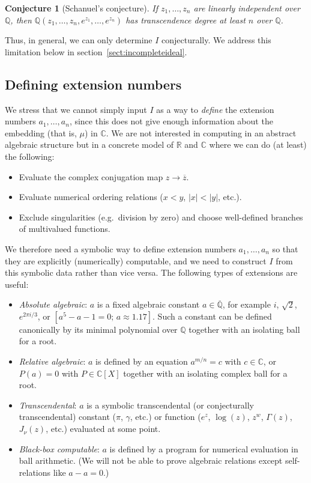 \documentclass[sigconf,screen,urlbreakonhyphens]{acmart}
\newtheorem{conjecture}[theorem]{Conjecture}
\begin{document}
\begin{conjecture}[Schanuel's conjecture]
If $z_1,\ldots,z_n$ are linearly independent over $\mathbb{Q}$,
then $\mathbb{Q}(z_1,\ldots,z_n,e^{z_1},\ldots,e^{z_n})$ has
transcendence degree at least $n$ over $\mathbb{Q}$.
\end{conjecture}

Thus, in general, we can only determine $I$ conjecturally.
We address this limitation below in section~\ref{sect:incompleteideal}.

\subsection{Defining extension numbers}

We stress that we cannot simply input $I$ as a way to \emph{define}
the extension numbers $a_1,\ldots,a_n$, since this does not
give enough information about the embedding (that is, $\mu$) in $\mathbb{C}$.
We are not interested in computing in an abstract algebraic
structure but in a concrete model of $\mathbb{R}$
and $\mathbb{C}$ where
we can do (at least) the following:
\begin{itemize}
\item Evaluate the complex conjugation map $z \to \overline{z}$.
\item Evaluate numerical ordering relations ($x < y$, $|x| < |y|$, etc.).
\item Exclude singularities (e.g.\ division by zero) and choose well-defined branches of multivalued functions.
\end{itemize}
We therefore need a symbolic way to define extension numbers
$a_1,\ldots,a_n$ so that they are explicitly (numerically) computable,
and we need to construct $I$ from this symbolic data
rather than vice versa.
The following types of extensions are useful:

\begin{itemize}
\item \emph{Absolute algebraic}: $a$ is a fixed algebraic constant $a \in \overline{\mathbb{Q}}$, for example
$i$, $\sqrt{2}$, $e^{2 \pi i / 3}$, or $[a^5-a-1=0; \, a\approx 1.17]$.
Such a constant can be defined canonically by its
minimal polynomial over $\mathbb{Q}$ together with an isolating
ball for a root.
\item \emph{Relative algebraic}: $a$ is defined by an equation $a^{m/n} = c$ with $c \in \mathbb{C}$, or $P(a) = 0$ with $P \in \mathbb{C}[X]$ together with an isolating complex ball for a root.
\item \emph{Transcendental}: $a$ is a symbolic transcendental (or conjecturally transcendental)
constant ($\pi$, $\gamma$, etc.) or function
($e^z$, $\log(z)$, $z^w$, $\Gamma(z)$, $J_{\nu}(z)$, etc.) evaluated at some point.
\item \emph{Black-box computable}: $a$ is defined by a program for numerical evaluation in ball arithmetic. (We will not be able to prove algebraic relations
except self-relations like $a - a = 0$.)
\end{itemize}
\end{document}
